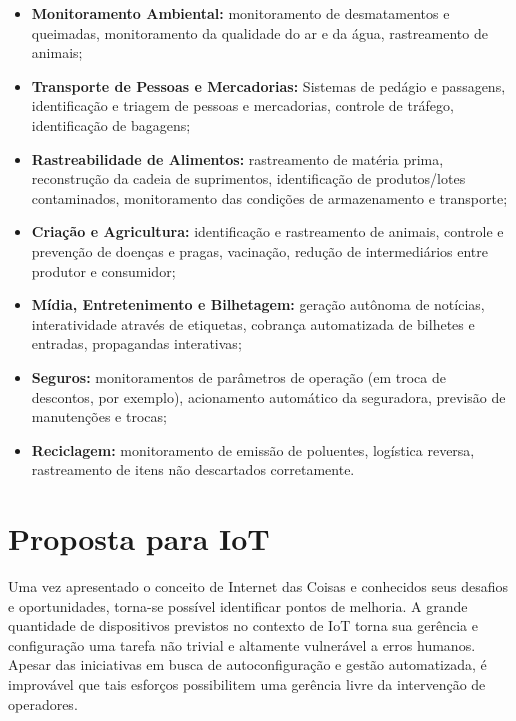 \documentclass[twoside,english,brazilian]{UNISINOSmonografia}
\begin{document}
\begin{itemize}
	\item \textbf{Monitoramento Ambiental:}
monitoramento de desmatamentos e queimadas, monitoramento da qualidade do ar e 
da água, rastreamento de animais;
	
	\item \textbf{Transporte de Pessoas e Mercadorias:}
Sistemas de pedágio e passagens, identificação e triagem de pessoas e 
mercadorias, controle de tráfego, identificação de bagagens;
	
	\item \textbf{Rastreabilidade de Alimentos:}
rastreamento de matéria prima, reconstrução da cadeia de suprimentos, 
identificação de produtos/lotes contaminados, monitoramento das condições de 
armazenamento e transporte;
	
	\item \textbf{Criação e Agricultura:}
identificação e rastreamento de animais, controle e prevenção de doenças e 
pragas, vacinação, redução de intermediários entre produtor e consumidor;
	
	\item \textbf{Mídia, Entretenimento e Bilhetagem:}
geração autônoma de notícias, interatividade através de etiquetas, cobrança 
automatizada de bilhetes e entradas, propagandas interativas;
	
	\item \textbf{Seguros:}
monitoramentos de parâmetros de operação (em troca de descontos, por exemplo), 
acionamento automático da seguradora, previsão de manutenções e trocas;
	
	\item \textbf{Reciclagem:}
monitoramento de emissão de poluentes, logística reversa, rastreamento de 
itens não descartados corretamente.
	
\end{itemize}



\chapter{Proposta para IoT}


Uma vez apresentado o conceito de Internet das Coisas e conhecidos seus 
desafios e oportunidades, torna-se possível identificar pontos de melhoria.
A grande quantidade de dispositivos previstos no contexto de IoT torna sua 
gerência e configuração uma tarefa não trivial e altamente vulnerável a erros 
humanos.
Apesar das iniciativas em busca de autoconfiguração e gestão automatizada, é 
improvável que tais esforços possibilitem uma gerência livre da intervenção de 
operadores.
\end{document}
